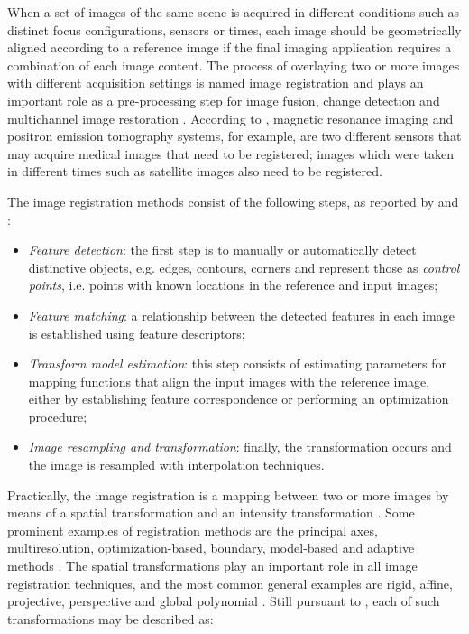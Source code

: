 When a set of images of the same scene is acquired in different conditions such as distinct focus configurations, sensors or times, each image should be geometrically aligned according to a reference image if the final imaging application requires a combination of each image content. The process of overlaying two or more images with different acquisition settings is named image registration and plays an important role as a pre-processing step for image fusion, change detection and multichannel image restoration \cite{zitova2003image}. According to , magnetic resonance imaging and positron emission tomography systems, for example, are two different sensors that may acquire medical images that need to be registered; images which were taken in different times such as satellite images also need to be registered.

The image registration methods consist of the following steps, as reported by  and :

\begin{itemize}
    \item \emph{Feature detection}: the first step is to manually or automatically detect distinctive objects, e.g. edges, contours, corners and represent those as \emph{control points}, i.e. points with known locations in the reference and input images;

    \item \emph{Feature matching}: a relationship between the detected features in each image is established using feature descriptors;

    \item \emph{Transform model estimation}: this step consists of estimating parameters for mapping functions that align the input images with the reference image, either by establishing feature correspondence or performing an optimization procedure;

    \item \emph{Image resampling and transformation}: finally, the transformation occurs and the image is resampled with interpolation techniques.

\end{itemize}

Practically, the image registration is a mapping between two or more images by means of a spatial transformation and an intensity transformation \cite{brown1992survey}. Some prominent examples of registration methods are the principal axes, multiresolution, optimization-based, boundary, model-based and adaptive methods  \cite{goshtasby2012image}. The spatial transformations play an important role in all image registration techniques, and the most common general examples are rigid, affine, projective, perspective and global polynomial \cite{brown1992survey}. Still pursuant to , each of such transformations may be described as:


